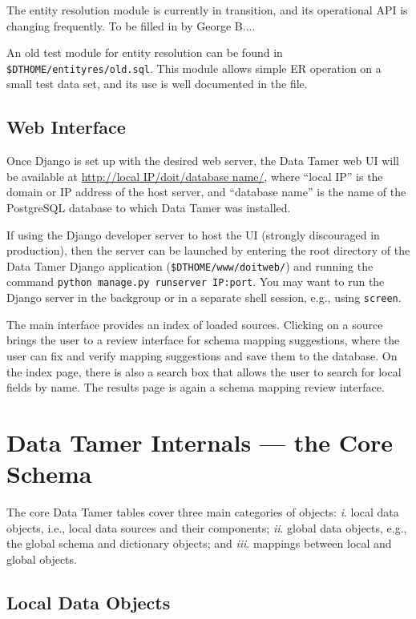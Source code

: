 \documentclass[12pt]{article}
\begin{document}
The entity resolution module is currently in transition, and its operational API is changing frequently.  To be filled in by George B....

An old test module for entity resolution can be found in \texttt{\$DTHOME/entityres/old.sql}.  This module allows simple ER operation on a small test data set, and its use is well documented in the file.


\subsection{Web Interface}

Once Django is set up with the desired web server, the Data Tamer web UI will be available at \url{http://local IP/doit/database name/}, where ``local IP'' is the domain or IP address of the host server, and ``database name'' is the name of the PostgreSQL database to which Data Tamer was installed.

If using the Django developer server to host the UI (strongly discouraged in production), then the server can be launched by entering the root directory of the Data Tamer Django application (\texttt{\$DTHOME/www/doitweb/}) and running the command \texttt{python manage.py runserver IP:port}.  You may want to run the Django server in the backgroup or in a separate shell session, e.g., using \texttt{screen}.

The main interface provides an index of loaded sources.  Clicking on a source brings the user to a review interface for schema mapping suggestions, where the user can fix and verify mapping suggestions and save them to the database.  On the index page, there is also a search box that allows the user to search for local fields by name.  The results page is again a schema mapping review interface.


\section{Data Tamer Internals --- the Core Schema}

The core Data Tamer tables cover three main categories of objects: \textit{i}. local data objects, i.e., local data sources and their components; \textit{ii}. global data objects, e.g., the global schema and dictionary objects; and \textit{iii}. mappings between local and global objects.


\subsection{Local Data Objects}
\end{document}

